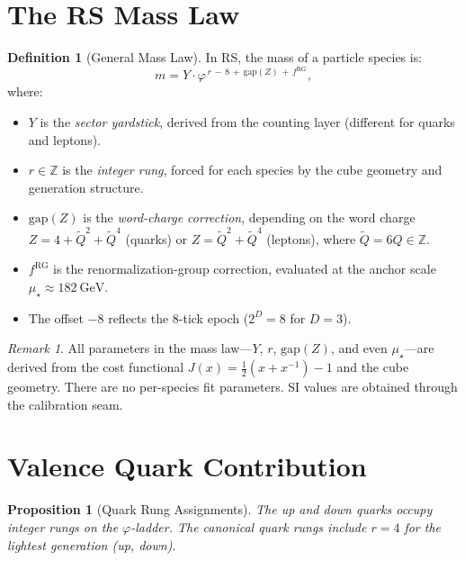 \documentclass[12pt,a4paper]{article}
\newtheorem{proposition}[theorem]{Proposition}
\theoremstyle{definition}
\newtheorem{definition}[theorem]{Definition}
\theoremstyle{remark}
\newtheorem{remark}[theorem]{Remark}
\begin{document}
\section{The RS Mass Law}
\label{sec:mass-law}

\begin{definition}[General Mass Law]
\label{def:masslaw}
In RS, the mass of a particle species is:
\begin{equation}
  \boxed{m = Y \cdot \varphi^{\,r\,-\,8\,+\,\mathrm{gap}(Z)
  \,+\,f^{\mathrm{RG}}},}
  \label{eq:masslaw}
\end{equation}
where:
\begin{itemize}[nosep]
  \item $Y$ is the \emph{sector yardstick}, derived from the
  counting layer (different for quarks and leptons).
  \item $r \in \mathbb{Z}$ is the \emph{integer rung}, forced
  for each species by the cube geometry and generation structure.
  \item $\mathrm{gap}(Z)$ is the \emph{word-charge correction},
  depending on the word charge
  $Z = 4 + \tilde{Q}^2 + \tilde{Q}^4$ (quarks) or
  $Z = \tilde{Q}^2 + \tilde{Q}^4$ (leptons), where
  $\tilde{Q} = 6Q \in \mathbb{Z}$.
  \item $f^{\mathrm{RG}}$ is the renormalization-group
  correction, evaluated at the anchor scale
  $\mu_\star \approx 182~\mathrm{GeV}$.
  \item The offset $-8$ reflects the 8-tick epoch
  ($2^D = 8$ for $D = 3$).
\end{itemize}
\end{definition}

\begin{remark}
All parameters in the mass law---$Y$, $r$, $\mathrm{gap}(Z)$,
and even $\mu_\star$---are derived from the cost functional
$J(x) = \frac{1}{2}(x + x^{-1}) - 1$ and the cube geometry.
There are no per-species fit parameters.  SI values are obtained
through the calibration seam.
\end{remark}

\section{Valence Quark Contribution}
\label{sec:valence}

\begin{proposition}[Quark Rung Assignments]
\label{prop:quarks}
The up and down quarks occupy integer rungs on the
$\varphi$-ladder.  The canonical quark rungs include $r = 4$
for the lightest generation (up, down).
\end{proposition}
\end{document}

